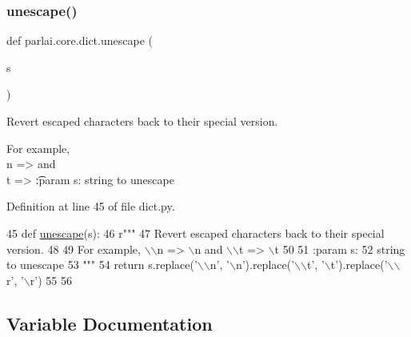 \subsubsection{\texorpdfstring{unescape()}{unescape()}}
{\footnotesize\ttfamily def parlai.\+core.\+dict.\+unescape (\begin{DoxyParamCaption}\item[{}]{s }\end{DoxyParamCaption})}

\begin{DoxyVerb}Revert escaped characters back to their special version.

For example, \\n => \n and \\t => \t

:param s:
    string to unescape
\end{DoxyVerb}
 

Definition at line 45 of file dict.\+py.


\begin{DoxyCode}
45 \textcolor{keyword}{def }\hyperlink{namespaceparlai_1_1core_1_1dict_a4d8952ff127b540967c707a58e8ebb48}{unescape}(s):
46     \textcolor{stringliteral}{r"""}
47 \textcolor{stringliteral}{    Revert escaped characters back to their special version.}
48 \textcolor{stringliteral}{}
49 \textcolor{stringliteral}{    For example, \(\backslash\)\(\backslash\)n => \(\backslash\)n and \(\backslash\)\(\backslash\)t => \(\backslash\)t}
50 \textcolor{stringliteral}{}
51 \textcolor{stringliteral}{    :param s:}
52 \textcolor{stringliteral}{        string to unescape}
53 \textcolor{stringliteral}{    """}
54     \textcolor{keywordflow}{return} s.replace(\textcolor{stringliteral}{'\(\backslash\)\(\backslash\)n'}, \textcolor{stringliteral}{'\(\backslash\)n'}).replace(\textcolor{stringliteral}{'\(\backslash\)\(\backslash\)t'}, \textcolor{stringliteral}{'\(\backslash\)t'}).replace(\textcolor{stringliteral}{'\(\backslash\)\(\backslash\)r', '}\(\backslash\)r')
55 
56 
\end{DoxyCode}


\subsection{Variable Documentation}
\mbox{\label{namespaceparlai_1_1core_1_1dict_a9adf6ecd08289a0b0faa90fd2a507e91}} 
